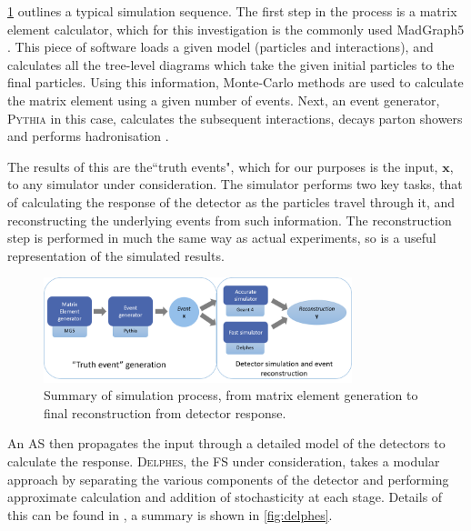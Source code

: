 \documentclass[twocolumn]{article}
\newcommand{\pkg}[1]{\textsc{#1}}
\begin{document}
\cref{fig:simdiag} outlines a typical simulation sequence. The first step in the process is a matrix element calculator, which for this investigation is the commonly used MadGraph5 \cite{madgraph}. This piece of software loads a given model (particles and interactions), and calculates all the tree-level diagrams which take the given initial particles to the final particles. Using this information, Monte-Carlo methods are used to calculate the matrix element using a given number of events. Next, an event generator, \pkg{Pythia} in this case, calculates the subsequent interactions, decays parton showers and performs hadronisation \cite{Gieseke2012}.

The results of this are the``truth events", which for our purposes is the input, $\mathbf{x}$, to any simulator under consideration. The simulator performs two key tasks, that of calculating the response of the detector as the particles travel through it, and reconstructing the underlying events from such information. The reconstruction step is performed in much the same way as actual experiments, so is a useful representation of the simulated results.        

\begin{figure}[!htbp]
	\centering
	\includegraphics[width=0.8\textwidth]{simdiag}
	
	\caption{Summary of simulation process, from matrix element generation to final reconstruction from detector response.}
	\label{fig:simdiag}
	
\end{figure}	


An AS then propagates the input through a detailed model of the detectors to calculate the response. \pkg{Delphes}, the FS under consideration, takes a modular approach by separating the various components of the detector and performing approximate calculation and addition of stochasticity at each stage. Details of this can be found in \cite{delphes}, a summary is shown in \cref{fig:delphes}.
\end{document}

